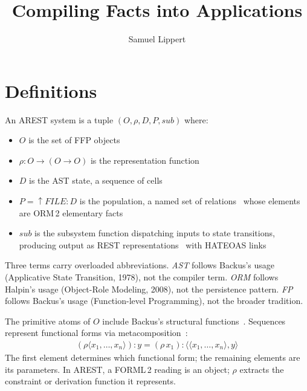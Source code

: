 \documentclass[acmsmall,screen,review]{acmart}
\title{Compiling Facts into Applications}
\author{Samuel Lippert}
\affiliation{%
  \institution{Example Inc}
  \city{Shakopee}
  \state{Minnesota}
  \country{USA}
}
\begin{document}
\maketitle

\section{Definitions}

\begin{definition}[AREST]\label{def:arest}
An AREST system is a tuple $(O, \rho, D, P, \mathit{sub})$ where:
\begin{itemize}[nosep]
\item $O$ is the set of FFP objects~\cite[Sec.\,13.2]{backus78}
\item $\rho: O \to (O \to O)$ is the representation function~\cite[Sec.\,13.3.2]{backus78}
\item $D$ is the AST state, a sequence of cells~\cite[Sec.\,14.3]{backus78}
\item $P = \uparrow\!\mathit{FILE}\!:\!D$ is the population, a named set of relations~\cite[Sec.\,1.6]{codd70} whose elements are ORM\,2 elementary facts~\cite[Ch.\,2]{halpin08}
\item $\mathit{sub}$ is the subsystem function dispatching inputs to state transitions, producing output as REST representations~\cite{fielding00} with HATEOAS links
\end{itemize}
\end{definition}

Three terms carry overloaded abbreviations. \emph{AST} follows Backus's usage (Applicative State Transition, 1978), not the compiler term. \emph{ORM} follows Halpin's usage (Object-Role Modeling, 2008), not the persistence pattern. \emph{FP} follows Backus's usage (Function-level Programming), not the broader tradition.

The primitive atoms of $O$ include Backus's structural functions~\cite[Sec.\,11.2.3]{backus78}. Sequences represent functional forms via metacomposition~\cite[Sec.\,13.3.2]{backus78}:
\begin{align}
(\rho\langle x_1, \ldots, x_n\rangle)\!:\!y = (\rho\,x_1)\!:\!\langle\langle x_1, \ldots, x_n\rangle, y\rangle \label{eq:metacomp}
\end{align}
The first element determines which functional form; the remaining elements are its parameters. In AREST, a FORML\,2 reading is an object; $\rho$ extracts the constraint or derivation function it represents.
\end{document}
